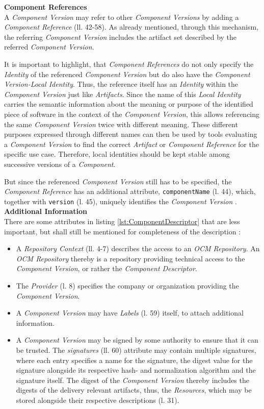 \noindent\textbf{Component References}\\
A \emph{Component Version} may refer to other \emph{Component Versions} by adding a \emph{Component Reference} (ll. 42-58). As already mentioned, through this mechanism, the referring \emph{Component Version} includes the artifact set described by the referred \emph{Component Version}.\par
It is important to highlight, that \emph{Component References} do not only specify the \emph{Identity} of the referenced \emph{Component Version} but do also have the \emph{Component Version-Local Identity}. Thus, the reference itself has an \emph{Identity} within the \emph{Component Version} just like \emph{Artifacts}. Since the name of this \emph{Local Identity} carries the semantic information about the meaning or purpose of the identified piece of software in the context of the \emph{Component Version}, this allows referencing the same \emph{Component Version} twice with different meaning. These different purposes expressed through different names can then be used by tools evaluating a \emph{Component Version} to find the correct \emph{Artifact} or \emph{Component Reference} for the specific use case. Therefore, local identities should be kept stable among successive versions of a \emph{Component}.\par
But since the referenced \emph{Component Version} still has to be specified, the \emph{Component Reference} has an additional attribute, \lstinline|componentName| (l. 44), which, together with \lstinline|version| (l. 45), uniquely identifies the \emph{Component Version} \cite{OCMSpec}.\\

\noindent\textbf{Additional Information}\\
There are some attributes in listing \ref{lst:ComponentDescriptor} that are less important, but shall still be mentioned for completeness of the description \cite{OCMSpec}:
\begin{itemize}
\item A \emph{Repository Context} (ll. 4-7) describes the access to an \emph{OCM Repository}. An \emph{OCM Repository} thereby is a repository providing technical access to the \emph{Component Version}, or rather the \emph{Component Descriptor}. 
\item The \emph{Provider} (l. 8) specifies the company or organization providing the \emph{Component Version}.
\item A \emph{Component Version} may have \emph{Labels} (l. 59) itself, to attach additional information. 
\item A \emph{Component Version} may be signed by some authority to ensure that it can be trusted. The \emph{signatures} (ll. 60) attribute may contain multiple signatures, where each entry specifies a name for the signature, the digest value for the signature alongside its respective hash- and normalization algorithm and the signature itself. The digest of the \emph{Component Version} thereby includes the digests of the delivery relevant artifacts, thus, the \emph{Resources}, which may be stored alongside their respective descriptions (l. 31).
\end{itemize}

